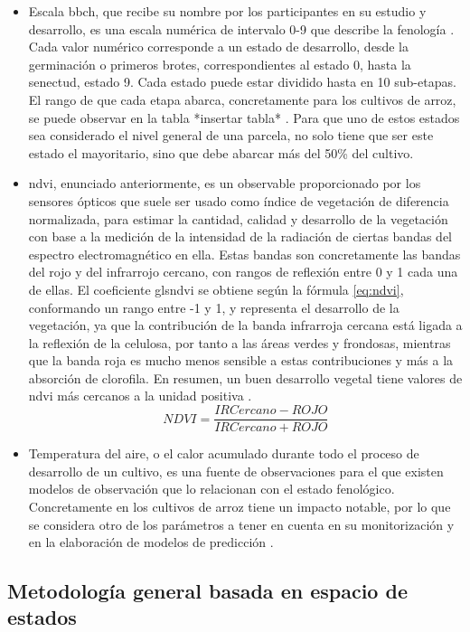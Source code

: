 \begin{itemize}
	\item Escala \gls{bbch}, que recibe su nombre por los participantes en su estudio y desarrollo, es una escala numérica de intervalo 0-9 que describe la fenología \cite{bbch}. Cada valor numérico corresponde a un estado de desarrollo, desde la germinación o primeros brotes, correspondientes al estado 0, hasta la senectud, estado 9. Cada estado puede estar dividido hasta en 10 sub-etapas. El rango de que cada etapa abarca, concretamente para los cultivos de arroz, se puede observar en la tabla *insertar tabla* \cite{bbcht}. Para que uno de estos estados sea considerado el nivel general de una parcela, no solo tiene que ser este estado el mayoritario, sino que debe abarcar más del 50\% del cultivo. 
	\item \gls{ndvi}, enunciado anteriormente, es un observable proporcionado por los sensores ópticos que suele ser usado como índice de vegetación de diferencia normalizada, para estimar la cantidad, calidad y desarrollo de la vegetación con base a la medición de la intensidad de la radiación de ciertas bandas del espectro electromagnético en ella. Estas bandas son concretamente las bandas del rojo y del infrarrojo cercano, con rangos de  reflexión entre 0 y 1 cada una de ellas. El coeficiente gls{ndvi} se obtiene según la fórmula \ref{eq:ndvi}, conformando un rango entre -1 y 1, y representa el desarrollo de la vegetación, ya que la contribución de la banda infrarroja cercana está ligada a la reflexión de la celulosa, por tanto a las áreas verdes y frondosas, mientras que la banda roja es mucho menos sensible a estas contribuciones y más a la absorción de clorofila. En resumen, un buen desarrollo vegetal tiene valores de \gls{ndvi} más cercanos a la unidad positiva \citep{ndvi}. 
	\begin{equation} \label{eq:ndvi}
		NDVI = \frac{IRCercano-ROJO}{IRCercano+ROJO}
	\end{equation}
	\item Temperatura del aire, o el calor acumulado durante todo el proceso de desarrollo de un cultivo, es una fuente de observaciones para el que existen modelos de observación que lo relacionan con el estado fenológico. Concretamente en los cultivos de arroz tiene un impacto notable, por lo que se considera otro de los parámetros a tener en cuenta en su monitorización y en la elaboración de modelos de predicción \cite{Juanma2016}.
\end{itemize} 


\subsection{Metodología general basada en espacio de estados}


